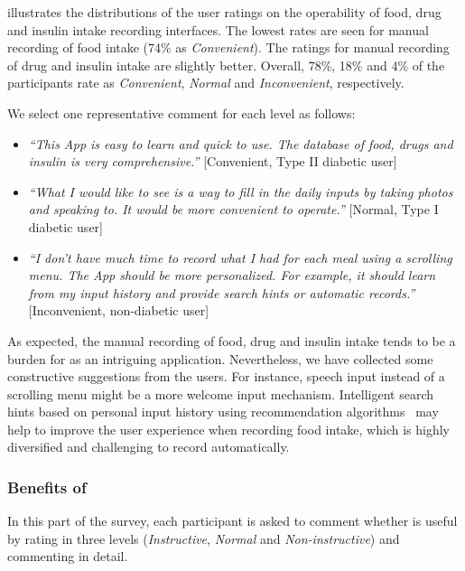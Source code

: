 { illustrates the distributions of the user ratings on the operability of food, drug and insulin intake recording interfaces.
The lowest rates are seen for manual recording of food intake (74\% as \textit{Convenient}).
The ratings for manual recording of drug and insulin intake are slightly better.
Overall, 78\%, 18\% and 4\% of the participants rate \sysname as \textit{Convenient}, \textit{Normal} and \textit{Inconvenient}, respectively.

We select one representative comment for each level as follows:
\begin{itemize}
  \item
  \textit{``This App is easy to learn and quick to use.
  The database of food, drugs and insulin is very comprehensive.''}
  [Convenient, Type II diabetic user]
  \item
  \textit{``What I would like to see is a way to fill in the daily inputs by taking photos and speaking to.
  It would be more convenient to operate.''}
  [Normal, Type I diabetic user]
  \item
  \textit{``I don't have much time to record what I had for each meal using a scrolling menu.
  The App should be more personalized.
  For example, it should learn from my input history and provide search hints or automatic records.''}
  [Inconvenient, non-diabetic user]
\end{itemize}

As expected, the manual recording of food, drug and insulin intake tends to be a burden for \sysname as an intriguing application.
Nevertheless, we have collected some constructive suggestions from the users.
For instance, speech input instead of a scrolling menu might be a more welcome input mechanism.
Intelligent search hints based on personal input history using recommendation algorithms~\cite{bib:fu2000mining} may help to improve the user experience when recording food intake, which is highly diversified and challenging to record automatically.

\subsubsection{Benefits of \sysname}
In this part of the survey, each participant is asked to comment whether \sysname is useful by rating \sysname in three levels (\textit{Instructive}, \textit{Normal} and \textit{Non-instructive}) and commenting in detail.

}
